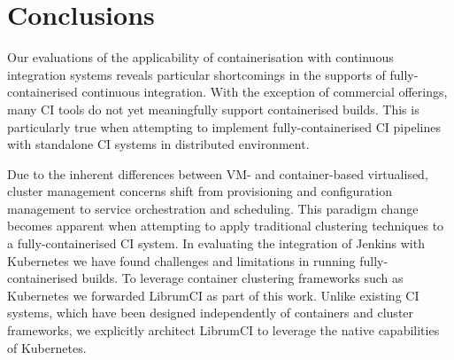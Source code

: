 \documentclass[journal]{IEEEtran}
\begin{document}
\section{Conclusions}
Our evaluations of the applicability of containerisation with continuous integration systems reveals 
particular shortcomings in the supports of fully-containerised continuous integration.
With the exception of commercial offerings, many CI tools do not yet meaningfully 
support containerised builds. This is particularly true when attempting to
implement fully-containerised CI pipelines with standalone CI systems
in distributed environment. 
\par
Due to the inherent differences between VM- and container-based virtualised,
cluster management concerns shift from provisioning and configuration management
to service orchestration and scheduling. This paradigm change becomes apparent 
when attempting to apply traditional clustering techniques to a fully-containerised CI system.
In evaluating the integration of Jenkins with Kubernetes we have found
challenges and limitations in running fully-containerised builds. To leverage 
container clustering frameworks such as Kubernetes we forwarded LibrumCI as part of this work.
Unlike existing CI systems, which have been designed independently of containers and cluster frameworks,
we explicitly architect LibrumCI to leverage the native capabilities of Kubernetes.



\end{document}
